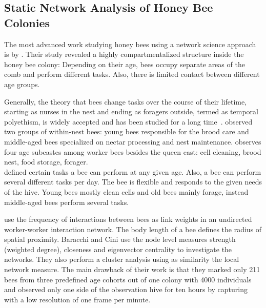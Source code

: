 \subsection{Static Network Analysis of Honey Bee Colonies}

The most advanced work studying honey bees using a network science approach is by \textcite{baracchi2014socio}.
Their study revealed a highly compartmentalized structure inside the honey bee colony:
Depending on their age, bees occupy separate areas of the comb and perform different tasks.
Also, there is limited contact between different age groups.

Generally, the theory that bees change tasks over the course of their lifetime, starting as nurses in the nest and ending as foragers outside, termed as temporal polyethism,  is widely accepted and has been studied for a long time~\cite{seeley1982adaptive, johnson2008within, lindauer1952beitrag}.
\textcite{johnson2008within} observed two groups of within-nest bees: young bees responsible for the brood care and middle-aged bees specialized on nectar processing and nest maintenance.
\textcite{seeley1982adaptive} observes four age subcastes among worker bees besides the queen cast: cell cleaning, brood nest, food storage, forager.\\
\textcite{lindauer1952beitrag} defined certain tasks a bee can perform at any given age. Also, a bee can perform several different tasks per day. The bee is flexible and responds to the given needs of the hive. Young bees mostly clean cells and old bees mainly forage, instead middle-aged bees perform several tasks.~\cite{lindauer1952beitrag}

\textcite{baracchi2014socio} use the frequency of interactions between bees as link weights in an undirected worker-worker interaction network.
The body length of a bee defines the radius of spatial proximity.
Baracchi and Cini use the node level measures strength (weighted degree), closeness and eigenvector centrality to investigate the networks.
They also perform a cluster analysis using as similarity the local network measure.
The main drawback of their work is that they marked only 211 bees from three predefined age cohorts out of one colony with 4000 individuals and observed only one side of the observation hive for ten hours by capturing with a low resolution of one frame per minute.

